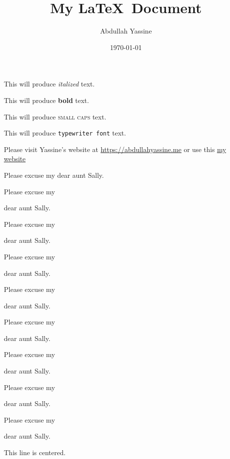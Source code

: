 \documentclass[11pt]{article}
\title{My \LaTeX\ Document}
\author{Abdullah Yassine}
\date{\today}
\begin{document}
\tableofcontents
\maketitle %

This will produce \textit{italized} text.

This will produce \textbf{bold} text.

This will produce \textsc{small caps} text.

This will produce \texttt{typewriter font} text.

Please visit Yassine's website at \url{https://abdullahyassine.me}
or use this \href{https://abdullahyassine.me}{my website}

\vspace{1cm}
Please excuse my dear aunt Sally.

Please excuse my \begin{large}dear aunt Sally.\end{large}

Please excuse my \begin{Large}dear aunt Sally.\end{Large}

Please excuse my \begin{huge}dear aunt Sally.\end{huge}

Please excuse my \begin{Huge}dear aunt Sally.\end{Huge}


\vspace{1cm}


Please excuse my \begin{normalsize}dear aunt Sally.\end{normalsize}

Please excuse my \begin{small}dear aunt Sally.\end{small}

Please excuse my \begin{scriptsize}dear aunt Sally.\end{scriptsize}

Please excuse my \begin{tiny}dear aunt Sally.\end{tiny}

\vspace{1cm}

\begin{center} %
    This line is centered.
\end{center}
\end{document}
